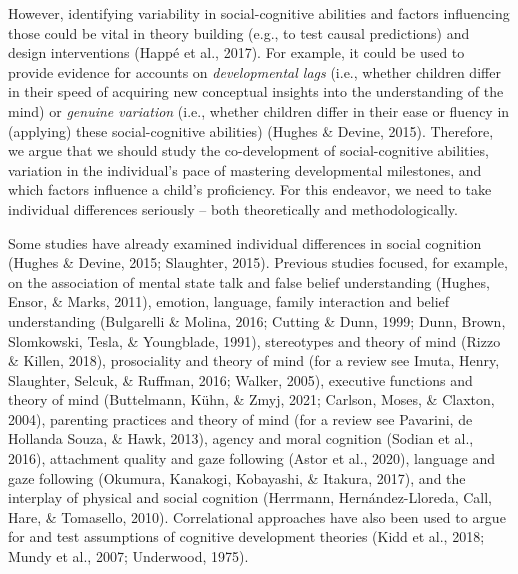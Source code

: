\documentclass[
  man,floatsintext]{apa6}
\begin{document}
However, identifying variability in social-cognitive abilities and factors influencing those could be vital in theory building (e.g., to test causal predictions) and design interventions (Happé et al., 2017).
For example, it could be used to provide evidence for accounts on \emph{developmental lags} (i.e., whether children differ in their speed of acquiring new conceptual insights into the understanding of the mind) or \emph{genuine variation} (i.e., whether children differ in their ease or fluency in (applying) these social-cognitive abilities) (Hughes \& Devine, 2015).
Therefore, we argue that we should study the co-development of social-cognitive abilities, variation in the individual's pace of mastering developmental milestones, and which factors influence a child's proficiency.
For this endeavor, we need to take individual differences seriously -- both theoretically and methodologically.

Some studies have already examined individual differences in social cognition (Hughes \& Devine, 2015; Slaughter, 2015).
Previous studies focused, for example,
on the association of mental state talk and false belief understanding (Hughes, Ensor, \& Marks, 2011),
emotion, language, family interaction and belief understanding (Bulgarelli \& Molina, 2016; Cutting \& Dunn, 1999; Dunn, Brown, Slomkowski, Tesla, \& Youngblade, 1991),
stereotypes and theory of mind (Rizzo \& Killen, 2018),
prosociality and theory of mind (for a review see Imuta, Henry, Slaughter, Selcuk, \& Ruffman, 2016; Walker, 2005),
executive functions and theory of mind (Buttelmann, Kühn, \& Zmyj, 2021; Carlson, Moses, \& Claxton, 2004),
parenting practices and theory of mind (for a review see Pavarini, de Hollanda Souza, \& Hawk, 2013),
agency and moral cognition (Sodian et al., 2016),
attachment quality and gaze following (Astor et al., 2020),
language and gaze following (Okumura, Kanakogi, Kobayashi, \& Itakura, 2017),
and the interplay of physical and social cognition (Herrmann, Hernández-Lloreda, Call, Hare, \& Tomasello, 2010).
Correlational approaches have also been used to argue for and test assumptions of cognitive development theories (Kidd et al., 2018; Mundy et al., 2007; Underwood, 1975).
\end{document}
